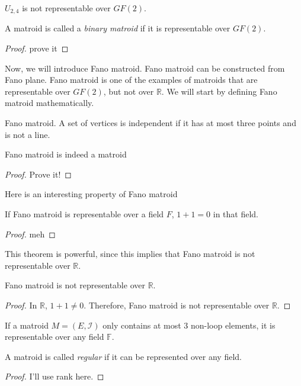 \begin{thm}
$U_{2, 4}$ is not representable over $GF(2)$.
\end{thm}

A matroid is called a \textit{binary matroid} if it is representable over $GF(2)$.

\begin{proof}
prove it
\end{proof}


Now, we will introduce Fano matroid.
Fano matroid can be constructed from Fano plane.
Fano matroid is one of the examples of matroids that are representable over $GF(2)$, but not over $\mathbb{R}$.
We will start by defining Fano matroid mathematically.

\begin{defn}
Fano matroid.  A set of vertices is independent if it has at most three points and is not a line.
\end{defn}

\begin{thm}
Fano matroid is indeed a matroid
\end{thm}

\begin{proof}
Prove it!
\end{proof}


Here is an interesting property of Fano matroid
\begin{thm}
If Fano matroid is representable over a field $F$, $1 + 1 = 0$ in that field.
\end{thm}

\begin{proof}
meh
\end{proof}

This theorem is powerful, since this implies that Fano matroid is not representable over $\mathbb{R}$.
\begin{cor}
Fano matroid is not representable over $\mathbb{R}$.
\end{cor}

\begin{proof}
In $\mathbb{R}$, $1 + 1 \neq 0$. Therefore, Fano matroid is not representable over $\mathbb{R}$.
\end{proof}


\begin{thm}
If a matroid $M = (E, \mathcal{I})$ only contains at most 3 non-loop elements, it is representable over any field $\mathbb{F}$.
\end{thm}

A matroid is called \textit{regular} if it can be represented over any field.

\begin{proof}
I'll use rank here.
\end{proof}


